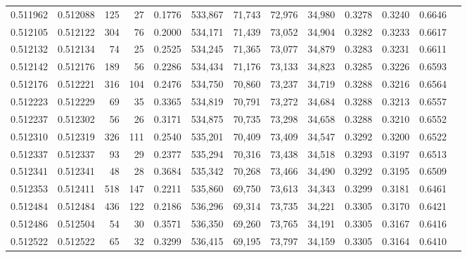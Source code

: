 \begin{tabular}{rrrrrrrrrrrrr}
0.511962 & 0.512088 &   125 &    27 &                                     0.1776 & 533,867 &  71,743 &  72,976 &  34,980 & 0.3278 & 0.3240 & 0.6646 \\
0.512105 & 0.512122 &   304 &    76 &                                     0.2000 & 534,171 &  71,439 &  73,052 &  34,904 & 0.3282 & 0.3233 & 0.6617 \\
0.512132 & 0.512134 &    74 &    25 &                                     0.2525 & 534,245 &  71,365 &  73,077 &  34,879 & 0.3283 & 0.3231 & 0.6611 \\
0.512142 & 0.512176 &   189 &    56 &                                     0.2286 & 534,434 &  71,176 &  73,133 &  34,823 & 0.3285 & 0.3226 & 0.6593 \\
0.512176 & 0.512221 &   316 &   104 &                                     0.2476 & 534,750 &  70,860 &  73,237 &  34,719 & 0.3288 & 0.3216 & 0.6564 \\
0.512223 & 0.512229 &    69 &    35 &                                     0.3365 & 534,819 &  70,791 &  73,272 &  34,684 & 0.3288 & 0.3213 & 0.6557 \\
0.512237 & 0.512302 &    56 &    26 &                                     0.3171 & 534,875 &  70,735 &  73,298 &  34,658 & 0.3288 & 0.3210 & 0.6552 \\
0.512310 & 0.512319 &   326 &   111 &                                     0.2540 & 535,201 &  70,409 &  73,409 &  34,547 & 0.3292 & 0.3200 & 0.6522 \\
0.512337 & 0.512337 &    93 &    29 &                                     0.2377 & 535,294 &  70,316 &  73,438 &  34,518 & 0.3293 & 0.3197 & 0.6513 \\
0.512341 & 0.512341 &    48 &    28 &                                     0.3684 & 535,342 &  70,268 &  73,466 &  34,490 & 0.3292 & 0.3195 & 0.6509 \\
0.512353 & 0.512411 &   518 &   147 &                                     0.2211 & 535,860 &  69,750 &  73,613 &  34,343 & 0.3299 & 0.3181 & 0.6461 \\
0.512484 & 0.512484 &   436 &   122 &                                     0.2186 & 536,296 &  69,314 &  73,735 &  34,221 & 0.3305 & 0.3170 & 0.6421 \\
0.512486 & 0.512504 &    54 &    30 &                                     0.3571 & 536,350 &  69,260 &  73,765 &  34,191 & 0.3305 & 0.3167 & 0.6416 \\
0.512522 & 0.512522 &    65 &    32 &                                     0.3299 & 536,415 &  69,195 &  73,797 &  34,159 & 0.3305 & 0.3164 & 0.6410 \\

\end{tabular}
